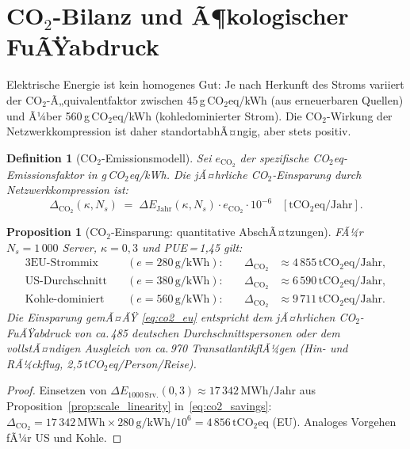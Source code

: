 ﻿\documentclass[12pt, a4paper, openany]{report}
\newtheorem{proposition}[theorem]{Proposition}
\newtheorem{definition}[theorem]{Definition}
\begin{document}
\section{CO\texorpdfstring{$_2$}{2}-Bilanz und Ã¶kologischer FuÃŸabdruck}
\label{sec:co2}

Elektrische Energie ist kein homogenes Gut: Je nach Herkunft des
Stroms variiert der CO{$_2$}-Ã„quivalentfaktor zwischen 45\,g\,CO$_2$eq/kWh
(aus erneuerbaren Quellen) und Ã¼ber 560\,g\,CO$_2$eq/kWh (kohledominierter
Strom).  Die CO$_2$-Wirkung der Netzwerkkompression ist daher
standortabhÃ¤ngig, aber stets positiv.

\begin{definition}[CO$_2$-Emissionsmodell]
\label{def:co2_model}
Sei $e_{\mathrm{CO_2}}$ der spezifische CO$_2$eq-Emissionsfaktor in
g\,CO$_2$eq/kWh.  Die jÃ¤hrliche CO$_2$-Einsparung durch
Netzwerkkompression ist:
\begin{equation}
  \label{eq:co2_savings}
  \Delta_{\mathrm{CO_2}}(\kappa, N_s)
  \;=\;
  \Delta E_{\mathrm{Jahr}}(\kappa, N_s) \cdot e_{\mathrm{CO_2}} \cdot 10^{-6}
  \;\;\;[\mathrm{tCO_2eq/Jahr}].
\end{equation}
\end{definition}

\begin{proposition}[CO$_2$-Einsparung: quantitative AbschÃ¤tzungen]
\label{prop:co2_estimates}
FÃ¼r $N_s = 1\,000$ Server, $\kappa = 0{,}3$ und PUE\,=\,1{,}45 gilt:
\begin{alignat}{3}
  \text{EU-Strommix}   &\quad(e = 280\,\mathrm{g/kWh}):\quad&
    \Delta_{\mathrm{CO_2}} &\approx 4\,855\,\mathrm{tCO_2eq/Jahr}, \label{eq:co2_eu} \\
  \text{US-Durchschnitt}&\quad(e = 380\,\mathrm{g/kWh}):\quad&
    \Delta_{\mathrm{CO_2}} &\approx 6\,590\,\mathrm{tCO_2eq/Jahr}, \label{eq:co2_us} \\
  \text{Kohle-dominiert}&\quad(e = 560\,\mathrm{g/kWh}):\quad&
    \Delta_{\mathrm{CO_2}} &\approx 9\,711\,\mathrm{tCO_2eq/Jahr}. \label{eq:co2_cn}
\end{alignat}
Die Einsparung gemÃ¤ÃŸ \eqref{eq:co2_eu} entspricht dem jÃ¤hrlichen
CO$_2$-FuÃŸabdruck von ca.\,485 deutschen Durchschnittspersonen oder
dem vollstÃ¤ndigen Ausgleich von ca.\,970 TransatlantikflÃ¼gen
(Hin- und RÃ¼ckflug, 2{,}5\,tCO$_2$eq/Person/Reise).
\end{proposition}

\begin{proof}
Einsetzen von $\Delta E_{1000\,\mathrm{Srv.}}(0{,}3) \approx 17\,342\,\mathrm{MWh/Jahr}$
aus Proposition~\ref{prop:scale_linearity} in~\eqref{eq:co2_savings}:
$\Delta_{\mathrm{CO_2}} = 17\,342\,\mathrm{MWh} \times 280\,\mathrm{g/kWh} / 10^6 = 4\,856\,\mathrm{tCO_2eq}$
(EU).  Analoges Vorgehen fÃ¼r US und Kohle.
\end{proof}
\end{document}
